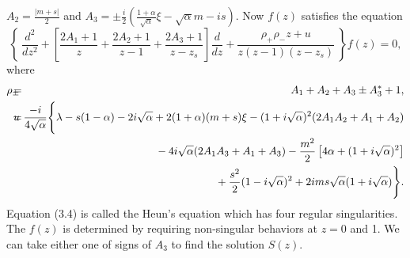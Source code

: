 $\displaystyle{A_2=\frac{|m+s|}{2}}$ and 
$\displaystyle{A_3=\pm\frac{i}{2}\left(\frac{1+\alpha}{\sqrt{\alpha}}\xi
-\sqrt{\alpha}m-is\right)}$.
Now $f(z)$ satisfies the equation
%
\begin{equation}
\left\{ \ \frac{d^2}{dz^2} + \left[\frac{2A_1+1}{z} + \frac{2A_2+1}{z-1}
+\frac{2A_3+1}{z-z_s} \right] \frac{d}{dz}
+ \frac{\rho_+ \rho_- z + u}{z (z-1)(z-z_s)} \ \right\} f(z) =0,
\label{eqn:HS}
\end{equation}
%
where 
%
\begin{eqnarray}
\rho_{\pm}\makebox[-3mm]{}&=&\makebox[-3mm]{}
A_1+A_2+A_3 \pm A_3^* +1, \\
u\makebox[-3mm]{}&=&\makebox[-3mm]{}
\frac{-i}{4\sqrt{\alpha}} \Bigg\{
\lambda-s(1-\alpha)-2i\sqrt{\alpha}+2(1+\alpha)(m+s)\xi
-(1+i\sqrt{\alpha})^2 (2A_1 A_2+A_1+A_2) \nonumber \\
&&\makebox[1cm]{}
- 4i\sqrt{\alpha}(2A_1 A_3+A_1+A_3)
-\frac{m^2}{2}\left[4\alpha+(1+i\sqrt{\alpha})^2\right] \nonumber \\
&&\makebox[1cm]{} +\frac{s^2}{2}(1-i\sqrt{\alpha})^2
+2ims\sqrt{\alpha}(1+i\sqrt{\alpha}) \Bigg\}.
\end{eqnarray}
%
Equation (3.4) is called the Heun's equation 
which has four regular singularities. The $f(z)$ is determined by 
requiring non-singular behaviors at $z=0$ and 1. We can take 
either one of signs of $A_3$ to find the solution $S(z)$. 


